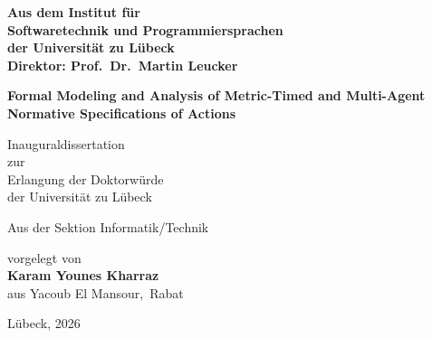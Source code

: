 
\begin{titlepage}
  \thispagestyle{empty}

  \vskip1cm

 


  \vskip0.5cm

  \normalfont\normalsize
\begin{center}
  \textbf{Aus dem Institut für} \\[0.25em]
  \textbf{Softwaretechnik und Programmiersprachen} \\[0.25em]
  \textbf{der Universität zu Lübeck} \\[0.25em]
  \textbf{Direktor: Prof.\ Dr.\ Martin Leucker}
\end{center}

  \vskip2cm

  \LARGE
  \begin{center}
  \textbf{Formal Modeling and Analysis of Metric-Timed and Multi-Agent Normative Specifications of Actions}
  \end{center}

  \vskip1cm

  \Large
  \begin{center}
  Inauguraldissertation\\
  zur\\
  Erlangung der Doktorwürde\\
  der Universität zu Lübeck
  \end{center}


  \normalsize
  \begin{center}
  Aus der Sektion Informatik/Technik
  \end{center}

  \vskip2cm

  \normalsize
  \begin{center}
  vorgelegt von\\[0.5em]
  \textbf{Karam Younes Kharraz}\\[0.5em]
  aus Yacoub El Mansour,~Rabat
  \end{center}

  \vfill

  \begin{center}
  Lübeck, 2026
  \end{center}

\end{titlepage}
\newpage
